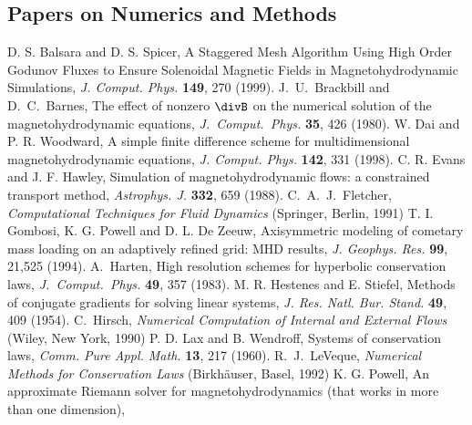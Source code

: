 \renewcommand{\bibname}{References}
\begin{thebibliography}{33}


\section*{Papers on Numerics and Methods}

    D. S. Balsara and D. S. Spicer,
    A Staggered Mesh Algorithm Using High Order Godunov Fluxes to Ensure
	   Solenoidal Magnetic Fields in Magnetohydrodynamic Simulations,
    {\it J. Comput. Phys.} {\bf 149}, 270 (1999).
    J.\ U.\ Brackbill and D.\ C.\ Barnes,
    The effect of nonzero $\divB$ on the numerical solution 
    of the magnetohydrodynamic equations,
    {\it J.\ Comput.\ Phys.} {\bf 35}, 426 (1980).
    W. Dai and P. R. Woodward,
    A simple finite difference scheme for multidimensional
	   magnetohydrodynamic equations,
    {\it J. Comput. Phys.} {\bf 142}, 331 (1998).
 C. R. Evans and J. F. Hawley,
   Simulation of magnetohydrodynamic flows:
	  a constrained transport method,
   {\it Astrophys. J.} {\bf 332}, 659 (1988).
    C.\ A.\ J.\ Fletcher, 
    {\it Computational Techniques for Fluid Dynamics}
    (Springer, Berlin, 1991)
    T. I. Gombosi, K. G. Powell and D. L. De Zeeuw, 
    Axisymmetric modeling of cometary mass loading on an adaptively
    refined grid: MHD results,
    {\it J. Geophys. Res.} {\bf 99}, 21,525 (1994).
    A.\ Harten,
    High resolution schemes for hyperbolic conservation laws,
    {\it J.\ Comput.\ Phys.} {\bf 49}, 357 (1983).
    M. R. Hestenes and E. Stiefel,
    Methods of conjugate gradients for solving linear systems,
    {\it J. Res. Natl. Bur. Stand.} {\bf 49}, 409 (1954).
    C.\ Hirsch,
    {\it Numerical Computation of Internal and External Flows}
    (Wiley, New York, 1990)
    P. D. Lax and B. Wendroff,
    Systems of conservation laws,
    {\it Comm. Pure Appl. Math.} {\bf 13}, 217 (1960).
    R.\ J.\ LeVeque,
    {\it Numerical Methods for Conservation Laws}
    (Birkh\"auser, Basel, 1992)
    K. G. Powell, 
    An approximate Riemann solver for magnetohydrodynamics
    (that works in more than one dimension),

\end{thebibliography}
